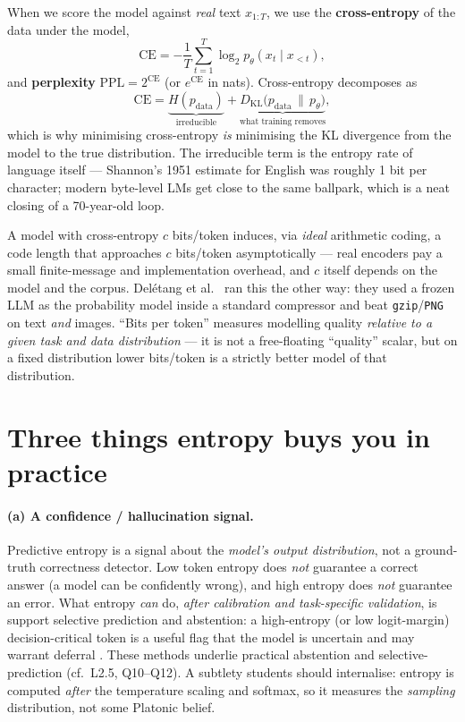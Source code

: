 \documentclass[11pt,letterpaper]{article}
\begin{document}
When we score the model against \emph{real} text $x_{1:T}$, we use the
\textbf{cross-entropy} of the data under the model,
\[
  \mathrm{CE} = -\frac{1}{T}\sum_{t=1}^{T} \log_2 p_\theta(x_t \mid x_{<t}),
\]
and \textbf{perplexity} $\mathrm{PPL}=2^{\mathrm{CE}}$ (or $e^{\mathrm{CE}}$ in
nats). Cross-entropy decomposes as
\[
  \mathrm{CE} = \underbrace{H(p_{\text{data}})}_{\text{irreducible}}
            + \underbrace{D_{\mathrm{KL}}\!\big(p_{\text{data}} \,\|\, p_\theta\big)}_{\text{what training removes}} ,
\]
which is why minimising cross-entropy \emph{is} minimising the KL divergence from
the model to the true distribution. The irreducible term is the entropy rate of
language itself --- Shannon's 1951 estimate \citep{shannon1951} for English was
roughly 1 bit per character; modern byte-level LMs get close to the same
ballpark, which is a neat closing of a 70-year-old loop.

\begin{keybox}
A model with cross-entropy $c$ bits/token induces, via \emph{ideal} arithmetic
coding, a code length that approaches $c$ bits/token asymptotically --- real
encoders pay a small finite-message and implementation overhead, and $c$ itself
depends on the model and the corpus. Del\'etang et al.\ \citeyearpar{deletang2023compression}
ran this the other way: they used a frozen LLM as the probability model inside a
standard compressor and beat \texttt{gzip}/\texttt{PNG} on text \emph{and}
images. ``Bits per token'' measures modelling quality \emph{relative to a given
task and data distribution} --- it is not a free-floating ``quality'' scalar, but
on a fixed distribution lower bits/token is a strictly better model of that
distribution.
\end{keybox}

\section{Three things entropy buys you in practice}

\paragraph{(a) A confidence / hallucination signal.}
Predictive entropy is a signal about the \emph{model's output distribution}, not a
ground-truth correctness detector. Low token entropy does \emph{not} guarantee a
correct answer (a model can be confidently wrong), and high entropy does
\emph{not} guarantee an error. What entropy \emph{can} do, \emph{after
calibration and task-specific validation}, is support selective prediction and
abstention: a high-entropy (or low logit-margin) decision-critical token is a
useful flag that the model is uncertain and may warrant deferral
\citep{holtzman2020nucleus}. These methods underlie practical abstention and
selective-prediction (cf.\ L2.5, Q10--Q12). A subtlety students should
internalise: entropy is computed \emph{after} the temperature scaling and
softmax, so it measures the \emph{sampling} distribution, not some Platonic belief.
\end{document}
